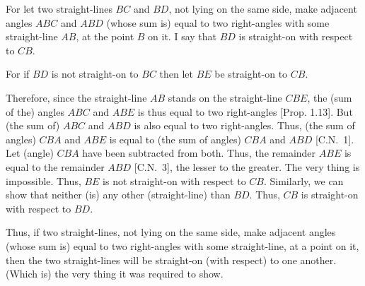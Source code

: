 \begin{Parallel}{}{}
{For let two
straight-lines $BC$ and $BD$, not lying on the same side,  make adjacent angles $ABC$ and $ABD$ (whose sum is)
equal to two right-angles with some straight-line $AB$, at the point $B$ on it. I say
that $BD$ is  straight-on with respect to $CB$.

For if $BD$ is not straight-on to $BC$ then let $BE$ be straight-on to $CB$.

Therefore, since the straight-line $AB$ stands on the straight-line $CBE$, the (sum of the) angles $ABC$ and $ABE$ is thus equal to two right-angles [Prop. 1.13]. But (the sum of) $ABC$ and $ABD$ is also equal to two right-angles.
Thus, 
(the sum of angles) $CBA$ and $ABE$ is equal to (the sum of angles) $CBA$ and $ABD$ [C.N.~1]. Let (angle)
$CBA$ have been subtracted from both. Thus, the remainder $ABE$ is
equal to the remainder $ABD$ [C.N.~3], the lesser to the greater. The very thing is impossible. Thus, $BE$ is not straight-on with respect to $CB$. Similarly, we can
show that neither (is) any other (straight-line)   than $BD$.
Thus, $CB$ is straight-on with respect to $BD$.

Thus, if two straight-lines, not lying on the same side,  make adjacent angles (whose sum is) equal to two right-angles with some straight-line, at a point on it, then the two straight-lines
will be straight-on (with respect) to one another. (Which is) the very thing it
was required to show.}
\end{Parallel}

